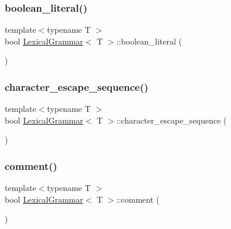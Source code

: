\subsubsection{\texorpdfstring{boolean\+\_\+literal()}{boolean\_literal()}}
{\footnotesize\ttfamily template$<$typename T $>$ \\
bool \hyperlink{class_lexical_grammar}{Lexical\+Grammar}$<$ T $>$\+::boolean\+\_\+literal (\begin{DoxyParamCaption}{ }\end{DoxyParamCaption})\hspace{0.3cm}{\ttfamily [inline]}}

\mbox{\label{class_lexical_grammar_abf0678a4b3e6cf81cfb7e87fdc88a1ab}} 
\subsubsection{\texorpdfstring{character\+\_\+escape\+\_\+sequence()}{character\_escape\_sequence()}}
{\footnotesize\ttfamily template$<$typename T $>$ \\
bool \hyperlink{class_lexical_grammar}{Lexical\+Grammar}$<$ T $>$\+::character\+\_\+escape\+\_\+sequence (\begin{DoxyParamCaption}{ }\end{DoxyParamCaption})\hspace{0.3cm}{\ttfamily [inline]}}

\mbox{\label{class_lexical_grammar_a342d05c7d8f59d5a4d0c7eb34fd97b3f}} 
\subsubsection{\texorpdfstring{comment()}{comment()}}
{\footnotesize\ttfamily template$<$typename T $>$ \\
bool \hyperlink{class_lexical_grammar}{Lexical\+Grammar}$<$ T $>$\+::comment (\begin{DoxyParamCaption}{ }\end{DoxyParamCaption})\hspace{0.3cm}{\ttfamily [inline]}}


